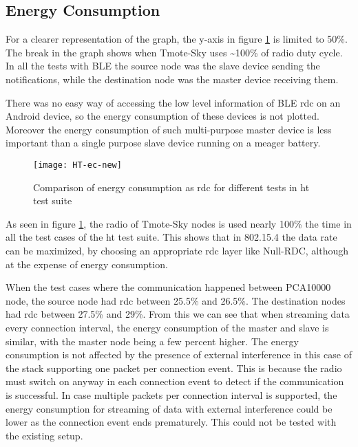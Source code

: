 
\subsection{Energy Consumption}
For a clearer representation of the graph, the y-axis in figure \ref{fig:HT-ec} is limited to 50\%. The break in the graph shows when Tmote-Sky uses \textasciitilde100\% of radio duty cycle. In all the tests with BLE the source node was the slave device sending the notifications, while the destination node was the master device receiving them.

There was no easy way of accessing the low level information of BLE \gls{rdc} on an Android device, so the energy consumption of these devices is not plotted. Moreover the energy consumption of such multi-purpose master device is less important than a single purpose slave device running on a meager battery.

\begin{figure}[tb]
\texttt{[image: HT-ec-new]}
\caption{Comparison of energy consumption as \gls{rdc} for different tests in \gls{ht} test suite}
\label{fig:HT-ec}
\end{figure}

As seen in figure \ref{fig:HT-ec}, the radio of Tmote-Sky nodes is used nearly 100\% the time in all the test cases of the \gls{ht} test suite. This shows that in 802.15.4 the data rate can be maximized, by choosing an appropriate \gls{rdc} layer like Null-RDC, although at the expense of energy consumption. 

When the test cases where the communication happened between PCA10000 node, the source node had \gls{rdc} between 25.5\% and 26.5\%. The destination nodes had \gls{rdc} between 27.5\% and 29\%. From this we can see that when streaming data every connection interval, the energy consumption of the master and slave is similar, with the master node being a few percent higher. The energy consumption is not affected by the presence of external interference in this case of the stack supporting one packet per connection event. This is because the radio must switch on anyway in each connection event to detect if the communication is successful. In case multiple packets per connection interval is supported, the energy consumption for streaming of data with external interference could be lower as the connection event ends prematurely. This could not be tested with the existing setup.

